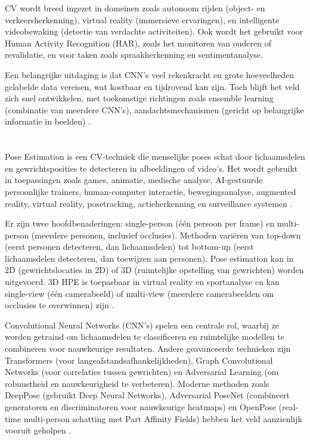 CV wordt breed ingezet in domeinen zoals autonoom rijden (object- en verkeersherkenning), virtual reality (immersieve ervaringen), en intelligente videobewaking (detectie van verdachte activiteiten). 
Ook wordt het gebruikt voor Human Activity Recognition (HAR), zoals het monitoren van ouderen of revalidatie, en voor taken zoals spraakherkenning en sentimentanalyse. 

Een belangrijke uitdaging is dat CNN's veel rekenkracht en grote hoeveelheden gelabelde data vereisen, wat kostbaar en tijdrovend kan zijn. 
Toch blijft het veld zich snel ontwikkelen, met toekomstige richtingen zoals ensemble learning (combinatie van meerdere CNN's), aandachtsmechanismen (gericht op belangrijke informatie in beelden) \autocite{ZhaoEtAl2024}. 

\section{}%
\label{sec:pose-estimation}
 
Pose Estimation is een CV-techniek die menselijke poses schat door lichaamsdelen en gewrichtsposities te detecteren in afbeeldingen of video's. 
Het wordt gebruikt in toepassingen zoals games, animatie, medische analyse, AI-gestuurde persoonlijke trainers, human-computer interactie, bewegingsanalyse, augmented reality, virtual reality, posetracking, actieherkenning en surveillance systemen \autocite{SiddharthEtAl2021}.

Er zijn twee hoofdbenaderingen: single-person (één persoon per frame) en multi-person (meerdere personen, inclusief occlusies). 
Methoden variëren van top-down (eerst personen detecteren, dan lichaamsdelen) tot bottom-up (eerst lichaamsdelen detecteren, dan toewijzen aan personen). 
Pose estimation kan in 2D (gewrichtslocaties in 2D) of 3D (ruimtelijke opstelling van gewrichten) worden uitgevoerd. 
3D HPE is toepasbaar in virtual reality en sportanalyse en kan single-view (één camerabeeld) of multi-view (meerdere camerabeelden om occlusies te overwinnen) zijn \autocite{ZhengEtAl2023}.

Convolutional Neural Networks (CNN's) spelen een centrale rol, waarbij ze worden getraind om lichaamsdelen te classificeren en ruimtelijke modellen te combineren voor nauwkeurige resultaten. 
Andere geavanceerde technieken zijn Transformers (voor langeafstandsafhankelijkheden), Graph Convolutional Networks (voor correlaties tussen gewrichten) en Adversarial Learning (om robuustheid en nauwkeurigheid te verbeteren). 
Moderne methoden zoals DeepPose (gebruikt Deep Neural Networks), Adversarial PoseNet (combineert generatoren en discriminatoren voor nauwkeurige heatmaps) en OpenPose (real-time multi-person schatting met Part Affinity Fields) hebben het veld aanzienlijk vooruit geholpen \autocite{ZhaoEtAl2024}.

